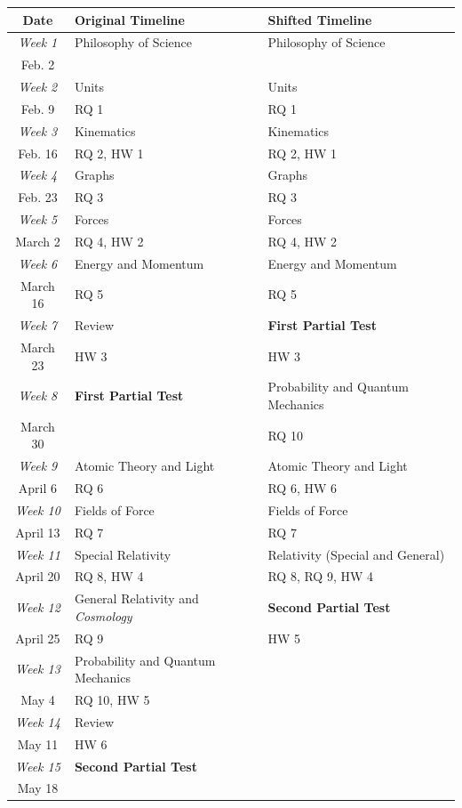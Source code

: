 \documentclass[12pt]{article}
\begin{document}
\noindent \begin{tabularx}{\textwidth}[c]{c X X}
	\hline
	\textbf{Date} & \textbf{Original Timeline} & \textbf{Shifted Timeline} \\
	\hline
	\textit{Week 1} & Philosophy of Science & Philosophy of Science \\
	{\small Feb. 2} & & \\
	\hline
	\textit{Week 2} & Units & Units \\
	{\small Feb. 9} & RQ 1 & RQ 1 \\
	\hline 
	\textit{Week 3} & Kinematics & Kinematics \\
	{\small Feb. 16} & RQ 2, HW 1 & RQ 2, HW 1 \\
	\hline
	\textit{Week 4} & Graphs & Graphs \\
	{\small Feb. 23} & RQ 3 & RQ 3 \\
	\hline
	\textit{Week 5} & Forces & Forces \\
	{\small March 2} & RQ 4, HW 2 & RQ 4, HW 2 \\
	\hline
	\textit{Week 6} & Energy and Momentum & Energy and Momentum \\
	{\small March 16} & RQ 5 & RQ 5 \\
	\hline
	\textit{Week 7} & Review & \textbf{First Partial Test} \\
	{\small March 23} & HW 3 & HW 3 \\
	\hline
	\textit{Week 8} & \textbf{First Partial Test} & Probability and Quantum Mechanics \\
	{\small March 30} & & RQ 10 \\
	\hline
	\textit{Week 9} & Atomic Theory and Light & Atomic Theory and Light \\
	{\small April 6} & RQ 6 & RQ 6, HW 6 \\
	\hline
	\textit{Week 10} & Fields of Force & Fields of Force \\
	{\small April 13} & RQ 7 & RQ 7 \\
	\hline
	\textit{Week 11} & Special Relativity & Relativity (Special and General) \\
	{\small April 20} & RQ 8, HW 4 & RQ 8, RQ 9, HW 4 \\
	\hline
	\textit{Week 12} & General Relativity and \textit{Cosmology} & \textbf{Second Partial Test} \\
	{\small April 25} & RQ 9 & HW 5 \\
	\hline
	\textit{Week 13} & Probability and Quantum Mechanics & \\
	{\small May 4} & RQ 10, HW 5 & \\
	\hline
	\textit{Week 14} & Review & \\
	{\small May 11} & HW 6 & \\
	\hline
	\textit{Week 15} & \textbf{Second Partial Test} & \\
	{\small May 18} & & \\
	\hline
	
\end{tabularx}
\end{document}
